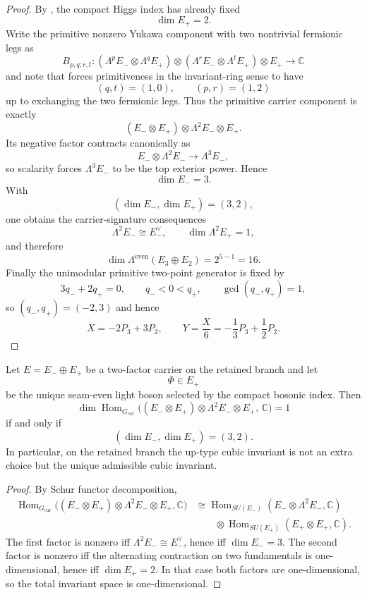\begin{proof}
By , the compact Higgs index has already fixed
\[
\dim E_+=2.
\]
Write the primitive nonzero Yukawa component with two nontrivial fermionic legs as
\[
B_{p,q;r,t}:
(\Lambda^p E_-\otimes \Lambda^q E_+)
\otimes
(\Lambda^r E_-\otimes \Lambda^t E_+)
\otimes E_+
\longrightarrow
\mathbb C
\]
and note that  forces primitiveness in the invariant-ring
sense to have
\[
(q,t)=(1,0),
\qquad
(p,r)=(1,2)
\]
up to exchanging the two fermionic legs. Thus the primitive carrier component is exactly
\[
(E_-\otimes E_+) \otimes \Lambda^2 E_- \otimes E_+.
\]
Its negative factor contracts canonically as
\[
E_- \otimes \Lambda^2 E_- \longrightarrow \Lambda^3 E_-,
\]
so scalarity forces $\Lambda^3 E_-$ to be the top exterior power. Hence
\[
\dim E_-=3.
\]
With
\[
(\dim E_-,\dim E_+)=(3,2),
\]
one obtains the carrier-signature consequences
\[
\Lambda^2 E_- \cong E_-^\vee,
\qquad
\dim\Lambda^2 E_+=1,
\]
and therefore
\[
\dim \Lambda^{\mathrm{even}}(E_3\oplus E_2)=2^{5-1}=16.
\]
Finally the unimodular primitive two-point generator is fixed by
\[
3q_-+2q_+=0,
\qquad
q_-<0<q_+,
\qquad
\gcd(q_-,q_+)=1,
\]
so $(q_-,q_+) = (-2,3)$ and hence
\[
X=-2P_3+3P_2,
\qquad
Y=\frac{X}{6}=-\frac13 P_3+\frac12 P_2.
\]
\end{proof}

\begin{lemma}
\label{lem:unique-cubic-weak-invariant}
Let $E=E_-\oplus E_+$ be a two-factor carrier on the retained branch and let
\[
\Phi\in E_+
\]
be the unique seam-even light boson selected by the compact bosonic index. Then
\[
\dim \operatorname{Hom}_{G_{\mathrm{car}}}\bigl((E_-\otimes E_+)\otimes \Lambda^2 E_-\otimes E_+,\,\mathbb C\bigr)=1
\]
if and only if
\[
(\dim E_-,\dim E_+)=(3,2).
\]
In particular, on the retained branch the up-type cubic invariant is not an extra choice but the
unique admissible cubic invariant.
\end{lemma}

\begin{proof}
By Schur functor decomposition,
\[
\begin{aligned}
\operatorname{Hom}_{G_{\mathrm{car}}}\bigl((E_-\otimes E_+)\otimes \Lambda^2 E_-\otimes E_+,\mathbb C\bigr)
&\cong
\operatorname{Hom}_{SU(E_-)}(E_-\otimes \Lambda^2E_-,\mathbb C)
\\
&\qquad\otimes
\operatorname{Hom}_{SU(E_+)}(E_+\otimes E_+,\mathbb C).
\end{aligned}
\]
The first factor is nonzero iff $\Lambda^2E_-\cong E_-^\vee$, hence iff $\dim E_-=3$. The second
factor is nonzero iff the alternating contraction on two fundamentals is one-dimensional, hence iff
$\dim E_+=2$. In that case both factors are one-dimensional, so the total invariant space is
one-dimensional.
\end{proof}

